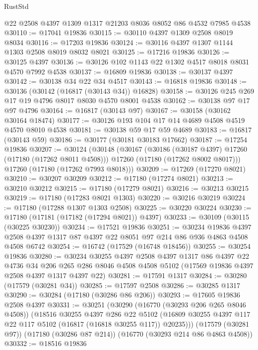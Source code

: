 \begin{lexlean}{RustStd}
\begin{coremodule}
{\begin{coremodule}
{{{{{{{{{{{{{{{{{{{{{{{{{{{{{{{{{{{{{{{{{{{{{{{{{{{{{{{    @22
    @2508
    @4397
    @1309
    @1317
    @21203
    @8036
    @8052
    @86
    @4532
    @7985
    @4538
@30110 := @17041 @19836
@30115 := @30110 @4397 @1309 @2508 @8019 @8034
@30116 := @17203 @19836
@30124 := @30116 @4397 @1307 @1144 @1303 @2508 @8019 @8032 @8021
@30125 := @17216 @19836
@30126 := @30125 @4397
@30136 := @30126 @102 @1143 @22 @1302 @4517 @8018 @8031 @4570 @7992 @4538
@30137 := @16809 @19836
@30138 := @30137 @4397
@30142 := @30138 @34 @22 @34 @4517
@30143 := @16818 @19836
@30148 := @30136 (@30142 (@16817 (@30143 @34)) @16828)
@30158 := @30126 @245 @269 @17 @19 @4796 @8017 @8030 @4570 @8001 @4538
@30162 := @30138 @97 @17 @97 @4796
@30164 := @16817 (@30143 @97)
@30167 := @30158 (@30162 @30164 @18474)
@30177 := @30126 @193 @104 @17 @14 @4689 @4508 @4519 @4570 @8010 @4538
@30181 := @30138 @59 @17 @59 @4689
@30183 := @16817 (@30143 @59)
@30186 := @30177 (@30181 @30183 @17662)
@30187 := @17254 @19836
@30207 := @30124
    (@30148
      (@30167
        (@30186 (@30187 @4397) @17260 (@17180 (@17262 @8011 @4508)))
        @17260
        (@17180 (@17262 @8002 @8017)))
      @17260
      (@17180 (@17262 @7993 @8018)))
@30209 := @17269 (@17270 @8021)
@30210 := @30207 @30209
@30212 := @17180 (@17274 @8021)
@30213 := @30210 @30212
@30215 := @17180 (@17279 @8021)
@30216 := @30213 @30215
@30219 := @17180 (@17283 @8021 @1303)
@30220 := @30216 @30219
@30224 := @17180 (@17288 @1307 @1303 @2508)
@30225 := @30220 @30224
@30230 := @17180 (@17181 (@17182 (@17294 @8021)) @4397)
@30233 := @30109 (@30115 (@30225 @30230))
@30234 := @17521 @19836
@30251 := @30234
    @19836
    @4397
    @2508
    @4397
    @1317
    @87
    @4397
    @22
    @8051
    @97
    @214
    @86
    @936
    @4863
    @4508
    @4508
    @6742
@30254 := @16742 (@17529 (@16748 @18456))
@30255 := @30254 @19836
@30280 := @30234
    @30255
    @4397
    @2508
    @4397
    @1317
    @86
    @4397
    @22
    @4736
    @34
    @206
    @265
    @286
    @8046
    @4508
    @4508
    @5102
    (@17569 @19836 @4397 @2508 @4397 @1317 @4397 @22)
@30281 := @17591 @1317
@30284 := @30280 (@17579 (@30281 @34))
@30285 := @17597 @2508
@30286 := @30285 @1317
@30290 := @30284 (@17180 (@30286 @86 @206))
@30293 := @17605 @19836 @2508 @4397
@30331 := @30251
    (@30290
      (@16770 (@30293 @206 @265 @8046 @4508))
      (@18516
        @30255
        @4397
        @286
        @22
        @5102
        (@16809 @30255 @4397 @117 @22 @117 @5102 (@16817 (@16818 @30255 @117)) @20235)))
    (@17579 (@30281 @97))
    (@17180 (@30286 @87 @214))
    (@16770 (@30293 @214 @86 @4863 @4508))
@30332 := @18516 @19836
}}}}}}}}}}}}}}}}}}}}}}}}}}}}}}}}}}}}}}}}}}}}}}}}}}}}}}}
\end{coremodule}}
\end{coremodule}
\end{lexlean}

